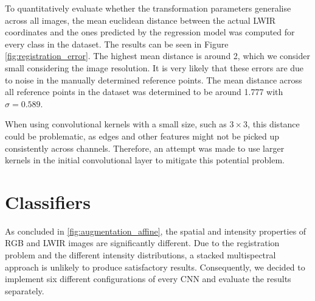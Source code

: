 \documentclass{l4proj}
\begin{document}
To quantitatively evaluate whether the transformation parameters generalise across all images, the mean euclidean distance between the actual LWIR coordinates and the ones predicted by the regression model was computed for every class in the dataset. The results can be seen in Figure \ref{fig:registration_error}. The highest mean distance is around 2, which we consider small considering the image resolution. It is very likely that these errors are due to noise in the manually determined reference points. The mean distance across all reference points in the dataset was determined to be around 1.777 with $\sigma = 0.589$.

When using convolutional kernels with a small size, such as $3 \times 3$, this distance could be problematic, as edges and other features might not be picked up consistently across channels. Therefore, an attempt was made to use larger kernels in the initial convolutional layer to mitigate this potential problem.


\section{Classifiers}

As concluded in \ref{fig:augmentation_affine}, the spatial and intensity properties of RGB and LWIR images are significantly different. Due to the registration problem and the different intensity distributions, a stacked multispectral approach is unlikely to produce satisfactory results. Consequently, we decided to implement six different configurations of every CNN and evaluate the results separately.
\end{document}
